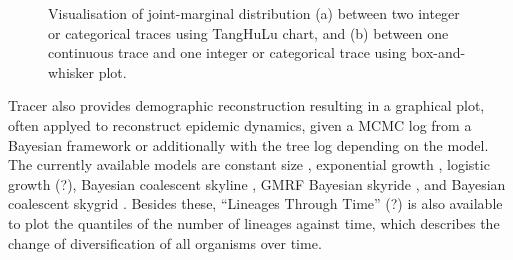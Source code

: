 \documentclass{bioinfo}
\begin{document}
\begin{figure}[ht]
\caption{Visualisation of joint-marginal distribution (a) between two integer or categorical traces using TangHuLu chart, and (b) between one continuous trace and one integer or categorical trace using box-and-whisker plot.}
\label{fig:tanghulu}
\end{figure}


Tracer also provides demographic reconstruction resulting in a graphical plot, often applyed to reconstruct epidemic dynamics, given a MCMC log from a Bayesian framework or additionally with the tree log depending on the model.
The currently available models are constant size \citep{drummond2002estimating}, exponential growth \citep{drummond2002estimating}, logistic growth (?), Bayesian coalescent skyline \citep{drummond2005bayesian}, GMRF Bayesian skyride \citep{minin2008smooth}, and Bayesian coalescent skygrid \citep{gill2012improving}.
Besides these, ``Lineages Through Time'' (?) is also available to plot the quantiles of the number of lineages against time, which describes the change of diversification of all organisms over time. %
\end{document}
